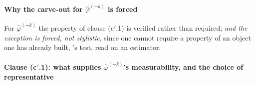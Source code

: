 \paragraph{Why the carve-out for $\hat\varphi^{(-k)}$ is forced}

For $\hat\varphi^{(-k)}$ the property of clause \textup{(c$'$.1)} is verified rather than required; \emph{and the exception is forced, not stylistic}, since
one cannot require a property of an object one has already built, 's test, read on an
estimator.

\paragraph{Clause \textup{(c$'$.1)}: what supplies $\hat\varphi^{(-k)}$'s measurability, and the choice of representative}


